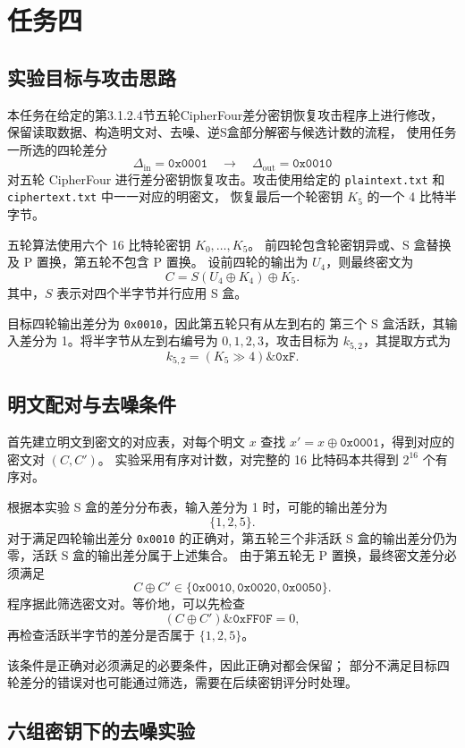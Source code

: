 \section{任务四}

\subsection{实验目标与攻击思路}

本任务在给定的第3.1.2.4节五轮CipherFour差分密钥恢复攻击程序上进行修改，
保留读取数据、构造明文对、去噪、逆S盒部分解密与候选计数的流程，
使用任务一所选的四轮差分
\[
    \Delta_{\mathrm{in}}=\texttt{0x0001}
    \quad\longrightarrow\quad
    \Delta_{\mathrm{out}}=\texttt{0x0010}
\]
对五轮 CipherFour 进行差分密钥恢复攻击。攻击使用给定的
\texttt{plaintext.txt} 和 \texttt{ciphertext.txt} 中一一对应的明密文，
恢复最后一个轮密钥 $K_5$ 的一个 4 比特半字节。

五轮算法使用六个 16 比特轮密钥 $K_0,\ldots,K_5$。
前四轮包含轮密钥异或、S 盒替换及 P 置换，第五轮不包含 P 置换。
设前四轮的输出为 $U_4$，则最终密文为
\[
    C=S(U_4\oplus K_4)\oplus K_5.
\]
其中，$S$ 表示对四个半字节并行应用 S 盒。

目标四轮输出差分为 \texttt{0x0010}，因此第五轮只有从左到右的
第三个 S 盒活跃，其输入差分为 1。将半字节从左到右编号为
$0,1,2,3$，攻击目标为 $k_{5,2}$，其提取方式为
\[
    k_{5,2}=(K_5\gg4)\mathbin{\&}\texttt{0xF}.
\]

\subsection{明文配对与去噪条件}

首先建立明文到密文的对应表，对每个明文 $x$ 查找
$x'=x\oplus\texttt{0x0001}$，得到对应的密文对 $(C,C')$。
实验采用有序对计数，对完整的 16 比特码本共得到 $2^{16}$ 个有序对。

根据本实验 S 盒的差分分布表，输入差分为 1 时，可能的输出差分为
\[
    \{1,2,5\}.
\]
对于满足四轮输出差分 \texttt{0x0010} 的正确对，第五轮三个非活跃
S 盒的输出差分仍为零，活跃 S 盒的输出差分属于上述集合。
由于第五轮无 P 置换，最终密文差分必须满足
\[
    C\oplus C'\in
    \{\texttt{0x0010},\texttt{0x0020},\texttt{0x0050}\}.
\]
程序据此筛选密文对。等价地，可以先检查
\[
    (C\oplus C')\mathbin{\&}\texttt{0xFF0F}=0,
\]
再检查活跃半字节的差分是否属于 $\{1,2,5\}$。

该条件是正确对必须满足的必要条件，因此正确对都会保留；
部分不满足目标四轮差分的错误对也可能通过筛选，需要在后续密钥评分时处理。

\subsection{六组密钥下的去噪实验}

